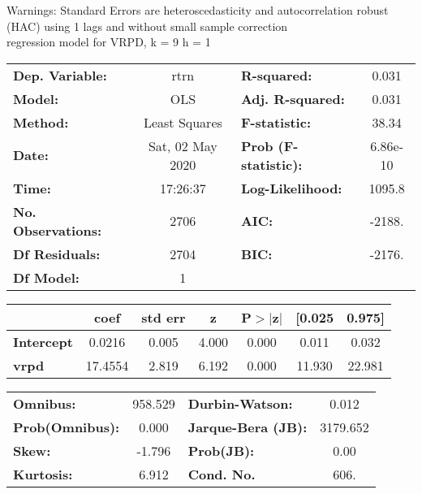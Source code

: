 Warnings: \newline
 [1] Standard Errors are heteroscedasticity and autocorrelation robust (HAC) using 1 lags and without small sample correction\\ 

regression model for VRPD, k = 9 h = 1\begin{center}
\begin{tabular}{lclc}
\toprule
\textbf{Dep. Variable:}    &       rtrn       & \textbf{  R-squared:         } &     0.031   \\
\textbf{Model:}            &       OLS        & \textbf{  Adj. R-squared:    } &     0.031   \\
\textbf{Method:}           &  Least Squares   & \textbf{  F-statistic:       } &     38.34   \\
\textbf{Date:}             & Sat, 02 May 2020 & \textbf{  Prob (F-statistic):} &  6.86e-10   \\
\textbf{Time:}             &     17:26:37     & \textbf{  Log-Likelihood:    } &    1095.8   \\
\textbf{No. Observations:} &        2706      & \textbf{  AIC:               } &    -2188.   \\
\textbf{Df Residuals:}     &        2704      & \textbf{  BIC:               } &    -2176.   \\
\textbf{Df Model:}         &           1      & \textbf{                     } &             \\
\bottomrule
\end{tabular}
\begin{tabular}{lcccccc}
                   & \textbf{coef} & \textbf{std err} & \textbf{z} & \textbf{P$> |$z$|$} & \textbf{[0.025} & \textbf{0.975]}  \\
\midrule
\textbf{Intercept} &       0.0216  &        0.005     &     4.000  &         0.000        &        0.011    &        0.032     \\
\textbf{vrpd}      &      17.4554  &        2.819     &     6.192  &         0.000        &       11.930    &       22.981     \\
\bottomrule
\end{tabular}
\begin{tabular}{lclc}
\textbf{Omnibus:}       & 958.529 & \textbf{  Durbin-Watson:     } &    0.012  \\
\textbf{Prob(Omnibus):} &   0.000 & \textbf{  Jarque-Bera (JB):  } & 3179.652  \\
\textbf{Skew:}          &  -1.796 & \textbf{  Prob(JB):          } &     0.00  \\
\textbf{Kurtosis:}      &   6.912 & \textbf{  Cond. No.          } &     606.  \\
\bottomrule
\end{tabular}
\end{center}

